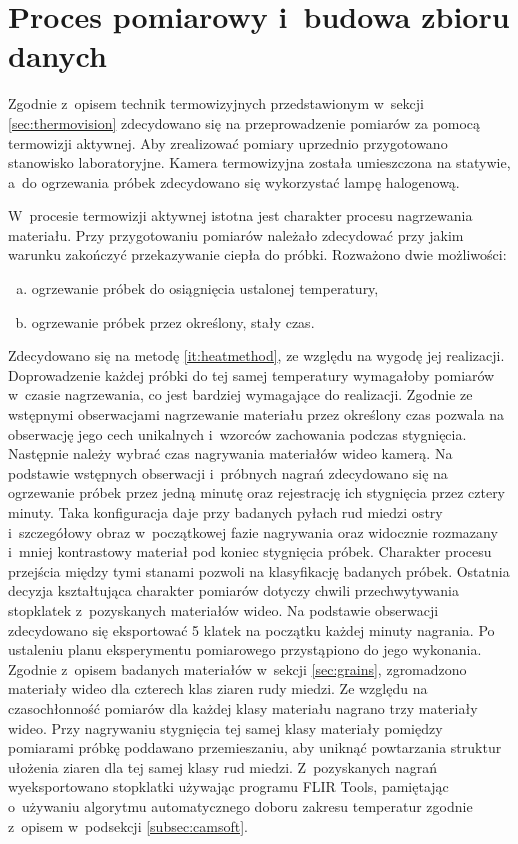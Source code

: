 \section{Proces pomiarowy i~budowa zbioru danych} \label{sec:meas}
Zgodnie z~opisem technik termowizyjnych przedstawionym w~sekcji
\ref{sec:thermovision} zdecydowano się na przeprowadzenie pomiarów za pomocą
termowizji aktywnej.
Aby zrealizować pomiary uprzednio przygotowano stanowisko laboratoryjne.
Kamera termowizyjna została umieszczona na statywie, a~do ogrzewania próbek
zdecydowano się wykorzystać lampę halogenową.

W~procesie termowizji aktywnej istotna jest charakter procesu nagrzewania
materiału.
Przy przygotowaniu pomiarów należało zdecydować przy jakim warunku zakończyć
przekazywanie ciepła do próbki.
Rozważono dwie możliwości:
\begin{enumerate}[a)]
	\item ogrzewanie próbek do osiągnięcia ustalonej temperatury,
	\item \label{it:heatmethod} ogrzewanie próbek przez określony, stały czas.
\end{enumerate}
Zdecydowano się na metodę \ref{it:heatmethod}, ze względu na wygodę jej
realizacji.
Doprowadzenie każdej próbki do tej samej temperatury wymagałoby pomiarów
w~czasie nagrzewania, co jest bardziej wymagające do realizacji.
Zgodnie ze wstępnymi obserwacjami nagrzewanie materiału przez określony
czas pozwala na obserwację jego cech unikalnych i~wzorców zachowania podczas
stygnięcia.
Następnie należy wybrać czas nagrywania materiałów wideo kamerą.
Na podstawie wstępnych obserwacji i~próbnych nagrań zdecydowano się na
ogrzewanie próbek przez jedną minutę oraz rejestrację ich stygnięcia przez
cztery minuty.
Taka konfiguracja daje przy badanych pyłach rud miedzi ostry i~szczegółowy
obraz w~początkowej fazie nagrywania oraz widocznie rozmazany i~mniej
kontrastowy materiał pod koniec stygnięcia próbek.
Charakter procesu przejścia między tymi stanami pozwoli na klasyfikację
badanych próbek.
Ostatnia decyzja kształtująca charakter pomiarów dotyczy chwili
przechwytywania stopklatek z~pozyskanych materiałów wideo.
Na podstawie obserwacji zdecydowano się eksportować 5 klatek na początku
każdej minuty nagrania.
Po ustaleniu planu eksperymentu pomiarowego przystąpiono do jego wykonania.
Zgodnie z~opisem badanych materiałów w~sekcji \ref{sec:grains}, zgromadzono
materiały wideo dla czterech klas ziaren rudy miedzi.
Ze względu na czasochłonność pomiarów dla każdej klasy materiału nagrano trzy
materiały wideo.
Przy nagrywaniu stygnięcia tej samej klasy materiały pomiędzy pomiarami
próbkę poddawano przemieszaniu, aby uniknąć powtarzania struktur
ułożenia ziaren dla tej samej klasy rud miedzi.
Z~pozyskanych nagrań wyeksportowano stopklatki używając programu FLIR Tools,
pamiętając o~używaniu algorytmu automatycznego doboru zakresu temperatur
zgodnie z~opisem w~podsekcji \ref{subsec:camsoft}.

